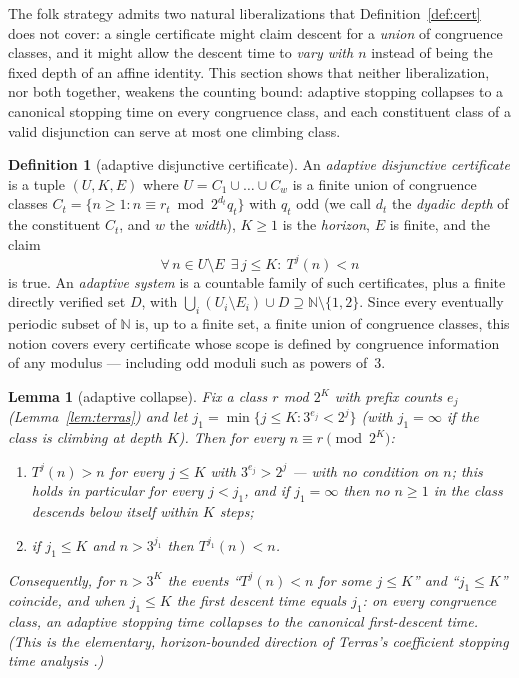 \documentclass[11pt]{article}
\newtheorem{lemma}[theorem]{Lemma}
\theoremstyle{definition}
\newtheorem{definition}[theorem]{Definition}
\newcommand{\N}{\mathbb{N}}
\begin{document}
The folk strategy admits two natural liberalizations that
Definition~\ref{def:cert} does not cover: a single certificate might claim
descent for a \emph{union} of congruence classes, and it might allow the
descent time to \emph{vary with $n$} instead of being the fixed depth of an
affine identity. This section shows that neither liberalization, nor both
together, weakens the counting bound: adaptive stopping collapses to a
canonical stopping time on every congruence class, and each constituent
class of a valid disjunction can serve at most one climbing class.

\begin{definition}[adaptive disjunctive certificate]\label{def:adaptive}
An \emph{adaptive disjunctive certificate} is a tuple $(U,K,E)$ where
$U=C_1\cup\dots\cup C_w$ is a finite union of congruence classes
$C_t=\{n\ge 1: n\equiv r_t \bmod 2^{d_t}q_t\}$ with $q_t$ odd
(we call $d_t$ the \emph{dyadic depth} of the constituent $C_t$, and $w$
the \emph{width}), $K\ge 1$ is the \emph{horizon}, $E$ is finite, and the
claim
\[
\forall\, n\in U\setminus E\ \ \exists\, j\le K:\ T^j(n)<n
\]
is true. An \emph{adaptive system} is a countable family of such
certificates, plus a finite directly verified set $D$, with
$\bigcup_i (U_i\setminus E_i)\cup D\supseteq\N\setminus\{1,2\}$.
Since every eventually periodic subset of $\N$ is, up to a finite set, a
finite union of congruence classes, this notion covers every certificate
whose scope is defined by congruence information of any modulus ---
including odd moduli such as powers of~$3$.
\end{definition}

\begin{lemma}[adaptive collapse]\label{lem:collapse}
Fix a class $r$ mod $2^K$ with prefix counts $e_j$
(Lemma~\ref{lem:terras}) and let
$j_1=\min\{j\le K: 3^{e_j}<2^j\}$ (with $j_1=\infty$ if the class is
climbing at depth $K$). Then for every $n\equiv r \pmod{2^K}$:
\begin{enumerate}
\item[(a)] $T^j(n)>n$ for every $j\le K$ with $3^{e_j}>2^j$ --- with no
  condition on $n$; this holds in particular for every $j<j_1$, and if
  $j_1=\infty$ then no $n\ge 1$ in the class descends below itself within
  $K$ steps;
\item[(b)] if $j_1\le K$ and $n>3^{j_1}$ then $T^{j_1}(n)<n$.
\end{enumerate}
Consequently, for $n>3^K$ the events ``$T^j(n)<n$ for some $j\le K$'' and
``$j_1\le K$'' coincide, and when $j_1\le K$ the first descent time equals
$j_1$:
on every congruence class, an adaptive stopping time collapses to the
canonical first-descent time. (This is the elementary, horizon-bounded
direction of Terras's coefficient stopping time analysis
\cite{Terras1976}.)
\end{lemma}
\end{document}
